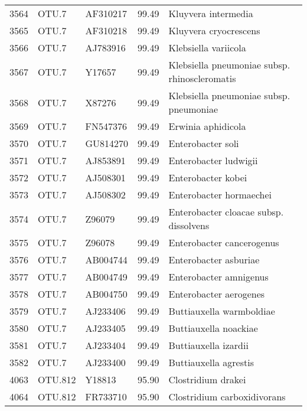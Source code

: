 \begin{tabular}{rllrl}
  3564 & OTU.7 & AF310217 & 99.49 & Kluyvera intermedia \\ 
  3565 & OTU.7 & AF310218 & 99.49 & Kluyvera cryocrescens \\ 
  3566 & OTU.7 & AJ783916 & 99.49 & Klebsiella variicola \\ 
  3567 & OTU.7 & Y17657 & 99.49 & Klebsiella pneumoniae subsp. rhinoscleromatis \\ 
  3568 & OTU.7 & X87276 & 99.49 & Klebsiella pneumoniae subsp. pneumoniae \\ 
  3569 & OTU.7 & FN547376 & 99.49 & Erwinia aphidicola \\ 
  3570 & OTU.7 & GU814270 & 99.49 & Enterobacter soli \\ 
  3571 & OTU.7 & AJ853891 & 99.49 & Enterobacter ludwigii \\ 
  3572 & OTU.7 & AJ508301 & 99.49 & Enterobacter kobei \\ 
  3573 & OTU.7 & AJ508302 & 99.49 & Enterobacter hormaechei \\ 
  3574 & OTU.7 & Z96079 & 99.49 & Enterobacter cloacae subsp. dissolvens \\ 
  3575 & OTU.7 & Z96078 & 99.49 & Enterobacter cancerogenus \\ 
  3576 & OTU.7 & AB004744 & 99.49 & Enterobacter asburiae \\ 
  3577 & OTU.7 & AB004749 & 99.49 & Enterobacter amnigenus \\ 
  3578 & OTU.7 & AB004750 & 99.49 & Enterobacter aerogenes \\ 
  3579 & OTU.7 & AJ233406 & 99.49 & Buttiauxella warmboldiae \\ 
  3580 & OTU.7 & AJ233405 & 99.49 & Buttiauxella noackiae \\ 
  3581 & OTU.7 & AJ233404 & 99.49 & Buttiauxella izardii \\ 
  3582 & OTU.7 & AJ233400 & 99.49 & Buttiauxella agrestis \\ 
  4063 & OTU.812 & Y18813 & 95.90 & Clostridium drakei \\ 
  4064 & OTU.812 & FR733710 & 95.90 & Clostridium carboxidivorans \\ 
   \hline
   \end{tabular}
